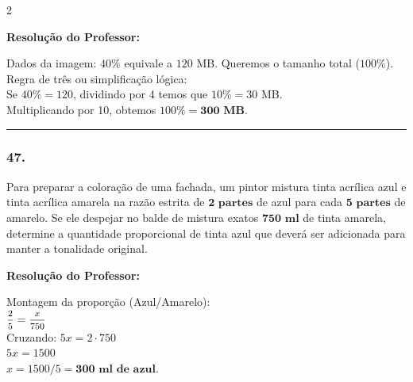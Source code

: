 \begin{multicols*}{2}
\ifgabarito
    \begin{tcolorbox}[colback=CorTitUm!5, colframe=CorTitUm, boxrule=1pt, arc=4pt, left=6pt, right=6pt, top=6pt, bottom=6pt]
    \small\textbf{\textcolor{CorTitUm}{Resolução do Professor:}}\par\vspace{0.1cm}
    \color{CinzaEscuro}
    Dados da imagem: $ 40\% $ equivale a $ 120 $ MB. Queremos o tamanho total ($ 100\% $).\\
    Regra de três ou simplificação lógica:\\
    Se $ 40\% = 120 $, dividindo por 4 temos que $ 10\% = 30 $ MB.\\
    Multiplicando por 10, obtemos $ 100\% = \textbf{300 MB} $.
    \end{tcolorbox}
\fi

\par\vspace{\espacoQuestao}

\noindent\textcolor{CorLinha}{\rule{\linewidth}{0.5pt}} 
\par\vspace{\espacoPreQuestao}
\subsubsection*{47.} Para preparar a coloração de uma fachada, um pintor mistura tinta acrílica azul e tinta acrílica amarela na razão estrita de $ \textbf{2 partes} $ de azul para cada $ \textbf{5 partes} $ de amarelo. Se ele despejar no balde de mistura exatos $ \textbf{750 ml} $ de tinta amarela, determine a quantidade proporcional de tinta azul que deverá ser adicionada para manter a tonalidade original.

\ifgabarito
    \begin{tcolorbox}[colback=CorTitUm!5, colframe=CorTitUm, boxrule=1pt, arc=4pt, left=6pt, right=6pt, top=6pt, bottom=6pt]
    \small\textbf{\textcolor{CorTitUm}{Resolução do Professor:}}\par\vspace{0.1cm}
    \color{CinzaEscuro}
    Montagem da proporção (Azul/Amarelo):\\
    $ \mfrac{2}{5} = \mfrac{x}{750} $\\
    Cruzando: $ 5x = 2 \cdot 750 $\\
    $ 5x = 1500 $\\
    $ x = 1500 / 5 = \textbf{300 ml de azul} $.
    \end{tcolorbox}
\fi


\end{multicols*}
